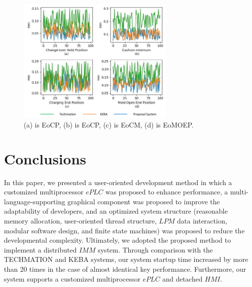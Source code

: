 \documentclass[journal,UTF8]{IEEEtran}
\begin{document}
\begin{figure}
	\centering
	\includegraphics[width=3in]{fig/Compare.pdf}
	\caption{(a) is EoCP, (b) is EoCP, (c) is EoCM, (d) is EoMOEP.}
	\label{fig:Compare}
\end{figure}
\section{Conclusions}
\label{conclusion}
In this paper, we presented a user-oriented development method in which a customized multiprocessor $ePLC$ was proposed to enhance performance, a multi-language-supporting graphical component was proposed to improve the adaptability of developers, and an optimized system structure (reasonable memory allocation, user-oriented thread structure, $LPM$ data interaction, modular software design, and finite state machines) was proposed to reduce the developmental complexity. Ultimately, we adopted the proposed method to implement a distributed $IMM$ system. Through comparison with the TECHMATION and KEBA systems, our system startup time increased by more than 20 times in the case of almost identical key performance. Furthermore, our system supports a customized multiprocessor $ePLC$ and detached $HMI$.





\ifCLASSOPTIONcaptionsoff
  \newpage
\fi





%
%
%
\end{document}
